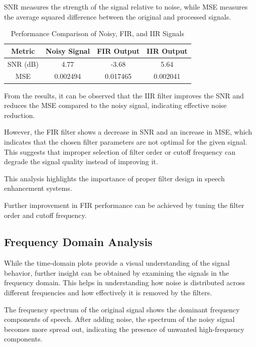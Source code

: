 \documentclass[conference]{IEEEtran}
\begin{document}
SNR measures the strength of the signal relative to noise, while MSE measures the average squared difference between the original and processed signals.

\begin{table}[htbp]
\centering
\caption{Performance Comparison of Noisy, FIR, and IIR Signals}
\begin{tabular}{|c|c|c|c|}
\hline
Metric & Noisy Signal & FIR Output & IIR Output \\
\hline
SNR (dB) & 4.77 & -3.68 & 5.64 \\
MSE & 0.002494 & 0.017465 & 0.002041 \\
\hline
\end{tabular}
\end{table}

From the results, it can be observed that the IIR filter improves the SNR and reduces the MSE compared to the noisy signal, indicating effective noise reduction.

However, the FIR filter shows a decrease in SNR and an increase in MSE, which indicates that the chosen filter parameters are not optimal for the given signal. This suggests that improper selection of filter order or cutoff frequency can degrade the signal quality instead of improving it.

This analysis highlights the importance of proper filter design in speech enhancement systems.

Further improvement in FIR performance can be achieved by tuning the filter order and cutoff frequency.

\subsection{Frequency Domain Analysis}

While the time-domain plots provide a visual understanding of the signal behavior, further insight can be obtained by examining the signals in the frequency domain. This helps in understanding how noise is distributed across different frequencies and how effectively it is removed by the filters.

The frequency spectrum of the original signal shows the dominant frequency components of speech. After adding noise, the spectrum of the noisy signal becomes more spread out, indicating the presence of unwanted high-frequency components.
\end{document}
